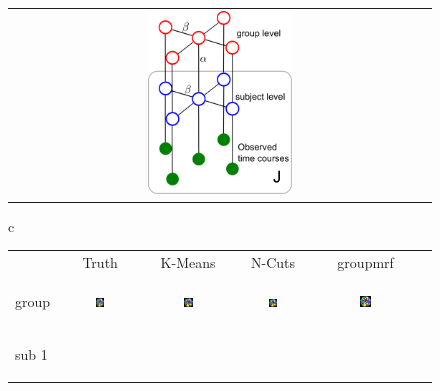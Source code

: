 \documentclass[runningheads,a4paper]{llncs}
\begin{document}
\begin{figure}[htb]
  \begin{tabular}[b]{c}
    \includegraphics[width=0.35\textwidth]{figure1/grp2}
  \end{tabular}
  \hspace{5pt}
  \begin{tabular}[b]{c}
    \begin{tabular}[b]{lccccc}
      & \footnotesize Truth & \footnotesize \textsf{K-Means} & \footnotesize \textsf{N-Cuts} & \footnotesize \textsf{groupmrf}\\
      \begin{sideways} \footnotesize group \end{sideways} &
      \includegraphics[width=0.12\textwidth]{figure1/truegrp} &
      \includegraphics[width=0.12\textwidth]{figure1/kmeans_grp} &
      \includegraphics[width=0.12\textwidth]{figure1/ncuts_grp} &
      \includegraphics[width=0.12\textwidth]{figure1/mrf_grp} \\
      \begin{sideways} \footnotesize sub 1 \end{sideways} &

\end{tabular}
\end{tabular}
\end{figure}
\end{document}
